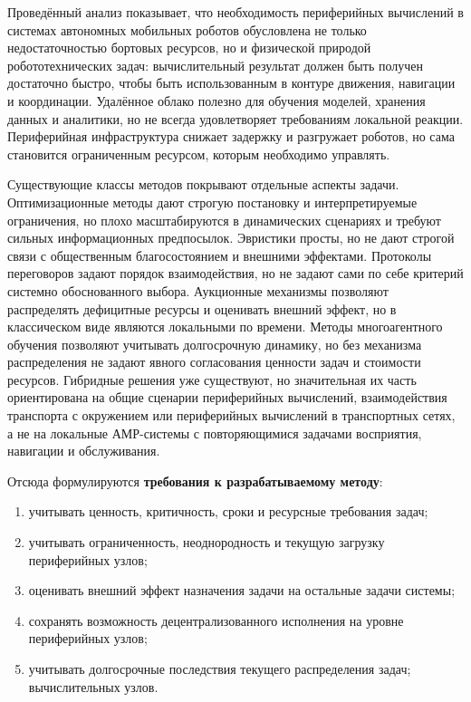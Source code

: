 Проведённый анализ показывает, что необходимость периферийных вычислений в системах автономных мобильных роботов обусловлена не только недостаточностью бортовых ресурсов, но и физической природой робототехнических задач: вычислительный результат должен быть получен достаточно быстро, чтобы быть использованным в контуре движения, навигации и координации. Удалённое облако полезно для обучения моделей, хранения данных и аналитики, но не всегда удовлетворяет требованиям локальной реакции. Периферийная инфраструктура снижает задержку и разгружает роботов, но сама становится ограниченным ресурсом, которым необходимо управлять.

Существующие классы методов покрывают отдельные аспекты задачи. Оптимизационные методы дают строгую постановку и интерпретируемые ограничения, но плохо масштабируются в динамических сценариях и требуют сильных информационных предпосылок. Эвристики просты, но не дают строгой связи с общественным благосостоянием и внешними эффектами. Протоколы переговоров задают порядок взаимодействия, но не задают сами по себе критерий системно обоснованного выбора. Аукционные механизмы позволяют распределять дефицитные ресурсы и оценивать внешний эффект, но в классическом виде являются локальными по времени. Методы многоагентного обучения позволяют учитывать долгосрочную динамику, но без механизма распределения не задают явного согласования ценности задач и стоимости ресурсов. Гибридные решения уже существуют,
но значительная их часть ориентирована на общие сценарии периферийных вычислений, взаимодействия транспорта с окружением или периферийных вычислений в транспортных сетях,
а не на локальные АМР-системы с повторяющимися задачами восприятия,
навигации и обслуживания.

Отсюда формулируются \textbf{требования к разрабатываемому методу}:
\begin{enumerate}
	\item учитывать ценность, критичность, сроки и ресурсные требования задач;
	\item учитывать ограниченность, неоднородность и текущую загрузку периферийных узлов;
	\item оценивать внешний эффект назначения задачи на остальные задачи системы;
	\item сохранять возможность децентрализованного исполнения на уровне
периферийных узлов;
	\item учитывать долгосрочные последствия текущего распределения задач;
вычислительных узлов.
\end{enumerate}

